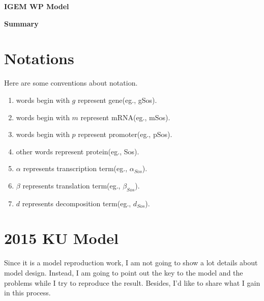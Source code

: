 \documentclass[12pt]{article}
\begin{document}
\graphicspath{{.}}  %
\thispagestyle{empty}



\vspace{20pt}
\centerline{{\Large \textbf{IGEM WP Model}}}
\vspace{15pt}

\centerline{{\large \textbf{Summary}}}
\vspace{7pt}






\newpage
\thispagestyle{empty}
\setcounter{page}{0}
\tableofcontents                                                  %
\newpage                                                          %
\section{Notations}
Here are some conventions about notation.
\begin{enumerate}
  \item words begin with $g$ represent gene(eg., gSos).
  \item words begin with $m$ represent mRNA(eg., mSos).
  \item words begin with $p$ represent promoter(eg., pSos).
  \item other words represent protein(eg., Sos).
  \item $\alpha$ represents transcription term(eg., $\alpha_{Sos}$).
  \item $\beta$ represents translation term(eg., $\beta_{Sos}$).
  \item $d$ represents decomposition term(eg., $d_{Sos}$).
\end{enumerate}

\section{2015 KU Model}
Since it is a model reproduction work, I am not going to show a lot details about model design. Instead, I am going to point out the key to the model and the problems while I try to reproduce the result. Besides, I'd like to share what I gain in this process.
\end{document}
